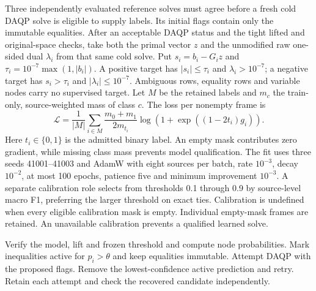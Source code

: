 Three independently evaluated reference solves must agree before a
fresh cold DAQP solve is eligible to supply labels. Its initial flags
contain only the immutable equalities. After an acceptable DAQP
status and the tight lifted and original-space checks, take both
the primal vector \(z\) and the unmodified raw one-sided dual
\(\lambda_i\) from that same cold solve. Put \(s_i=b_i-G_i z\) and
\(\tau_i=10^{-7}\max(1,|b_i|)\). A positive target has
\(|s_i|\le\tau_i\) and \(\lambda_i>10^{-7}\); a negative target
has \(s_i>\tau_i\) and \(|\lambda_i|\le10^{-7}\). Ambiguous rows,
equality rows and variable nodes carry no supervised target.
Let \(M\) be the retained labels and \(m_c\) the train-only,
source-weighted mass of class \(c\). The loss per nonempty frame is
\begin{equation}\label{eq:learn-daqp-bce}
 \mathcal L=\frac{1}{|M|}\sum_{i\in M}\frac{m_0+m_1}{2m_{t_i}}
       \log(1+\exp((1-2t_i)g_i)).
\end{equation}
Here \(t_i\in\{0,1\}\) is the admitted binary label. An empty mask
contributes zero gradient, while missing class mass prevents model
qualification. The fit uses three seeds 41001--41003 and AdamW with
eight sources per batch, rate \(10^{-3}\), decay \(10^{-2}\),
at most 100 epochs, patience five and minimum improvement \(10^{-3}\).
A separate calibration role selects from thresholds 0.1 through 0.9
by source-level macro F1, preferring the larger threshold on exact
ties. Calibration is undefined when every eligible calibration mask
is empty. Individual empty-mask frames are retained. An unavailable
calibration prevents a qualified learned solve.

\begin{algorithm}[ht]
\caption{Predict, repair and verify a DAQP working set}\label{alg:learn-daqp}
\begin{algorithmic}[1]
\State Verify the model, lift and frozen threshold and compute node probabilities.
\State Mark inequalities active for \(p_i>\theta\) and keep equalities immutable.
\State Attempt DAQP with the proposed flags.
 \State Remove the lowest-confidence active prediction and retry.
\EndWhile
\State Retain each attempt and check the recovered candidate independently.
\end{algorithmic}
\end{algorithm}

